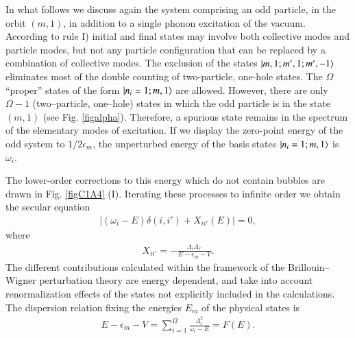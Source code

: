 In what follows we discuss again the system comprising an odd particle, in the orbit $(m, 1)$, in addition to a single phonon excitation of the vacuum. 
According to rule I) initial and final states may involve both collective modes and particle modes, but not any particle configuration that can be replaced by a combination of collective modes. The exclusion of the states $|{m,1; m',1;m',-1} \rangle$ eliminates most of the double counting of two-particle, one-hole states. The $\Omega$ ``proper'' states of the form $|{n_i=1;m,1} \rangle$ are allowed. However, 
there are only $\Omega-1$ (two--particle, one--hole) states in which the odd particle is in the state $(m, 1)$ (see Fig. \ref{figalpha}). Therefore, a spurious state remains in the spectrum of the elementary modes of excitation. If we display the zero-point energy of the odd system to $1/2\epsilon_m$, the unperturbed energy of the basis states $|{n_i=1;m,1} \rangle$ is $\omega_i$.


The lower-order corrections to this energy which do not contain bubbles 
are drawn in Fig. \ref{figC1A4} (I). Iterating these processes to infinite order we obtain the secular equation 
  \begin{align}\label{eqC1A56} 
\left|(\omega_i-E)\delta(i,i')+X_{ii'}(E)\right|=0,
  \end{align}   
  where
    \begin{align}\label{eqC1A57} 
   X_{ii'}=-\frac{\Lambda_i\Lambda_{i'}}{E-\epsilon_m-V}.
    \end{align} 
The different contributions calculated within the framework of the Brillouin--Wigner perturbation theory are energy dependent, and take into account renormalization effects of the states not explicitly included in the calculations. The dispersion relation fixing the energies $E_m$ of the physical states is
  \begin{align}\label{eqC1A60} 
 E-\epsilon_m-V=\sum_{i=1}^{\Omega}\frac{\Lambda_i^2}{\omega_i-E}=F(E).
  \end{align} 


